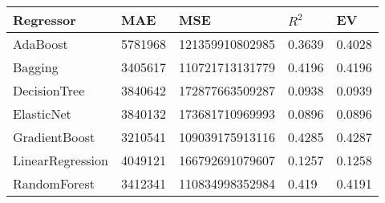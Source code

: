 \begin{tabular}{|p{3cm}p{1.5cm}p{2.5cm}p{1.2cm}p{1.2cm}|}
  \hline
Regressor & MAE & MSE & $R^2$ & EV \\ 
  \hline \hline
AdaBoost & 5781968 & 121359910802985 & 0.3639 & 0.4028 \\ 
  Bagging & 3405617 & 110721713131779 & 0.4196 & 0.4196 \\ 
  DecisionTree & 3840642 & 172877663509287 & 0.0938 & 0.0939 \\ 
  ElasticNet & 3840132 & 173681710969993 & 0.0896 & 0.0896 \\ 
  GradientBoost & 3210541 & 109039175913116 & 0.4285 & 0.4287 \\ 
  LinearRegression & 4049121 & 166792691079607 & 0.1257 & 0.1258 \\ 
  RandomForest & 3412341 & 110834998352984 & 0.419 & 0.4191 \\ 
   \hline
\end{tabular}
